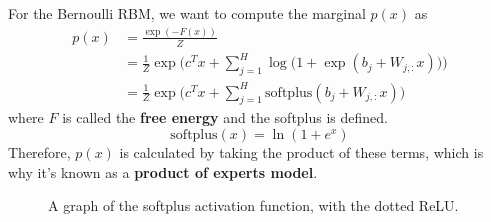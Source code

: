 \documentclass{article}
\begin{document}
    \begin{lemma} 
      For the Bernoulli RBM, we want to compute the marginal $p(x)$ as
      \begin{align*} 
      p(x) & = \frac{\exp(-F(x))}{Z} \\
                    & = \frac{1}{Z} \exp \bigg( c^T x + \sum_{j=1}^H \log \big( 1 + \exp (b_j + W_{j, :} x) \big) \bigg) \\
                    & = \frac{1}{Z} \exp \bigg( c^T x + \sum_{j=1}^H \mathrm{softplus}(b_j + W_{j, :} x ) \bigg)
      \end{align*}
      where $F$ is called the \textbf{free energy} and the softplus is defined. 
      \begin{equation}
        \text{softplus}(x) = \ln(1 + e^x)
      \end{equation}
      Therefore, $p(x)$ is calculated by taking the product of these terms, which is why it's known as a \textbf{product of experts model}. 

      \begin{figure}[H]
        \centering 
        \caption{A graph of the softplus activation function, with the dotted ReLU.} 
        \label{fig:softplus}
      \end{figure}
    \end{lemma}
\end{document}
